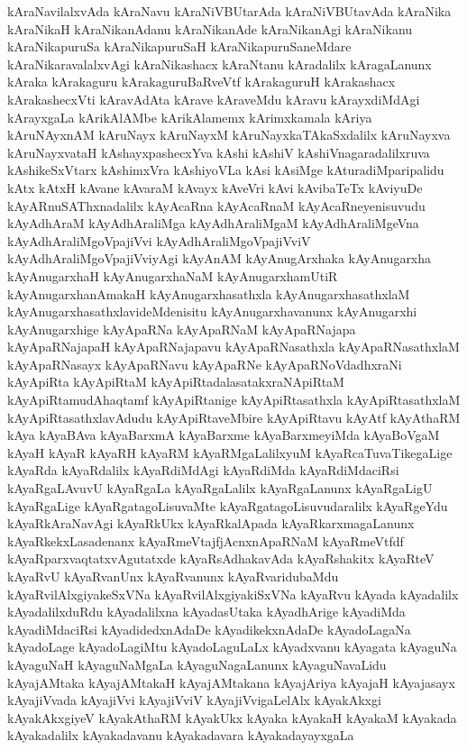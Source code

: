 {kAraNavilalxvAda
kAraNavu
kAraNiVBUtarAda
kAraNiVBUtavAda
kAraNika
kAraNikaH
kAraNikanAdanu
kAraNikanAde
kAraNikanAgi
kAraNikanu
kAraNikapuruSa
kAraNikapuruSaH
kAraNikapuruSaneMdare
kAraNikaravalalxvAgi
kAraNikashacx
kAraNtanu
kAradalilx
kAragaLanunx
kAraka
kArakaguru
kArakaguruBaRveVtf
kArakaguruH
kArakashacx
kArakashecxVti
kAravAdAta
kArave
kAraveMdu
kAravu
kArayxdiMdAgi
kArayxgaLa
kArikAlAMbe
kArikAlamemx
kArimxkamala
kAriya
kAruNAyxnAM
kAruNayx
kAruNayxM
kAruNayxkaTAkaSxdalilx
kAruNayxva
kAruNayxvataH
kAshayxpashecxYva
kAshi
kAshiV
kAshiVnagaradalilxruva
kAshikeSxVtarx
kAshimxVra
kAshiyoVLa
kAsi
kAsiMge
kAturadiMparipalidu
kAtx
kAtxH
kAvane
kAvaraM
kAvayx
kAveVri
kAvi
kAvibaTeTx
kAviyuDe
kAyARnuSAThxnadalilx
kAyAcaRna
kAyAcaRnaM
kAyAcaRneyenisuvudu
kAyAdhAraM
kAyAdhAraliMga
kAyAdhAraliMgaM
kAyAdhAraliMgeVna
kAyAdhAraliMgoVpajiVvi
kAyAdhAraliMgoVpajiVviV
kAyAdhAraliMgoVpajiVviyAgi
kAyAnAM
kAyAnugArxhaka
kAyAnugarxha
kAyAnugarxhaH
kAyAnugarxhaNaM
kAyAnugarxhamUtiR
kAyAnugarxhanAmakaH
kAyAnugarxhasathxla
kAyAnugarxhasathxlaM
kAyAnugarxhasathxlavideMdenisitu
kAyAnugarxhavanunx
kAyAnugarxhi
kAyAnugarxhige
kAyApaRNa
kAyApaRNaM
kAyApaRNajapa
kAyApaRNajapaH
kAyApaRNajapavu
kAyApaRNasathxla
kAyApaRNasathxlaM
kAyApaRNasayx
kAyApaRNavu
kAyApaRNe
kAyApaRNoVdadhxraNi
kAyApiRta
kAyApiRtaM
kAyApiRtadalasatakxraNApiRtaM
kAyApiRtamudAhaqtamf
kAyApiRtanige
kAyApiRtasathxla
kAyApiRtasathxlaM
kAyApiRtasathxlavAdudu
kAyApiRtaveMbire
kAyApiRtavu
kAyAtf
kAyAthaRM
kAya
kAyaBAva
kAyaBarxmA
kAyaBarxme
kAyaBarxmeyiMda
kAyaBoVgaM
kAyaH
kAyaR
kAyaRH
kAyaRM
kAyaRMgaLalilxyuM
kAyaRcaTuvaTikegaLige
kAyaRda
kAyaRdalilx
kAyaRdiMdAgi
kAyaRdiMda
kAyaRdiMdaciRsi
kAyaRgaLAvuvU
kAyaRgaLa
kAyaRgaLalilx
kAyaRgaLanunx
kAyaRgaLigU
kAyaRgaLige
kAyaRgatagoLisuvaMte
kAyaRgatagoLisuvudaralilx
kAyaRgeYdu
kAyaRkAraNavAgi
kAyaRkUkx
kAyaRkalApada
kAyaRkarxmagaLanunx
kAyaRkekxLasadenanx
kAyaRmeVtajfjAcnxnApaRNaM
kAyaRmeVtfdf
kAyaRparxvaqtatxvAgutatxde
kAyaRsAdhakavAda
kAyaRshakitx
kAyaRteV
kAyaRvU
kAyaRvanUnx
kAyaRvanunx
kAyaRvaridubaMdu
kAyaRvilAlxgiyakeSxVNa
kAyaRvilAlxgiyakiSxVNa
kAyaRvu
kAyada
kAyadalilx
kAyadalilxduRdu
kAyadalilxna
kAyadasUtaka
kAyadhArige
kAyadiMda
kAyadiMdaciRsi
kAyadidedxnAdaDe
kAyadikekxnAdaDe
kAyadoLagaNa
kAyadoLage
kAyadoLagiMtu
kAyadoLaguLaLx
kAyadxvanu
kAyagata
kAyaguNa
kAyaguNaH
kAyaguNaMgaLa
kAyaguNagaLanunx
kAyaguNavaLidu
kAyajAMtaka
kAyajAMtakaH
kAyajAMtakana
kAyajAriya
kAyajaH
kAyajasayx
kAyajiVvada
kAyajiVvi
kAyajiVviV
kAyajiVvigaLelAlx
kAyakAkxgi
kAyakAkxgiyeV
kAyakAthaRM
kAyakUkx
kAyaka
kAyakaH
kAyakaM
kAyakada
kAyakadalilx
kAyakadavanu
kAyakadavara
kAyakadayayxgaLa
}
